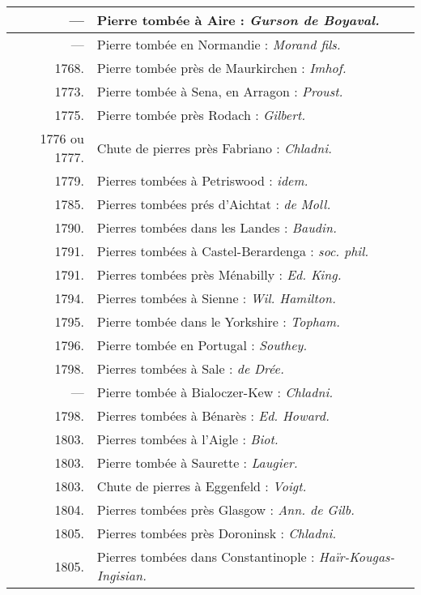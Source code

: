 \documentclass[a4paper, 12pt, oneside, french]{article}
\begin{document}
\begin{center}
\begin{longtable}{r p{85mm}}
        --- & Pierre tombée à Aire : \emph{Gurson de Boyaval.}   \\ \hline
        --- & Pierre tombée en Normandie : \emph{Morand fils.}   \\ \hline
        1768. & Pierre tombée près de Maurkirchen : \emph{Imhof.}   \\ \hline
        1773. & Pierre tombée à Sena, en Arragon : \emph{Proust.}   \\ \hline
        1775. & Pierre tombée près Rodach : \emph{Gilbert.}   \\ \hline
        1776 ou 1777. & Chute de pierres près Fabriano : \emph{Chladni.}   \\ \hline
        1779. & Pierres tombées à Petriswood : \emph{idem.}   \\ \hline
        1785. & Pierres tombées prés d'Aichtat : \emph{de Moll.}   \\ \hline
        1790. & Pierres tombées dans les Landes : \emph{Baudin.}   \\ \hline
        1791. & Pierres tombées à Castel-Berardenga : \emph{soc. phil.}   \\ \hline
        1791. & Pierres tombées près Ménabilly : \emph{Ed. King.}   \\ \hline
        1794. & Pierres tombées à Sienne : \emph{Wil. Hamilton.}   \\ \hline
        1795. & Pierre tombée dans le Yorkshire : \emph{Topham.}   \\ \hline
        1796. & Pierre tombée en Portugal : \emph{Southey.}   \\ \hline
        1798. & Pierres tombées à Sale : \emph{de Drée.}   \\ \hline
        --- & Pierre tombée à Bialoczer-Kew : \emph{Chladni.}   \\ \hline
        1798. & Pierres tombées à Bénarès : \emph{Ed. Howard.}   \\ \hline
        1803. & Pierres tombées à l'Aigle : \emph{Biot.}   \\ \hline
        1803. & Pierre tombée à Saurette : \emph{Laugier.}   \\ \hline
        1803. & Chute de pierres à Eggenfeld : \emph{Voigt.}   \\ \hline
        1804. & Pierres tombées près Glasgow : \emph{Ann. de Gilb.}   \\ \hline
        1805. & Pierres tombées près Doroninsk : \emph{Chladni.}   \\ \hline
        1805. & Pierres tombées dans Constantinople : \emph{Haïr-Kougas-Ingisian.}   \\ \hline

\end{longtable}
\end{center}
\end{document}
